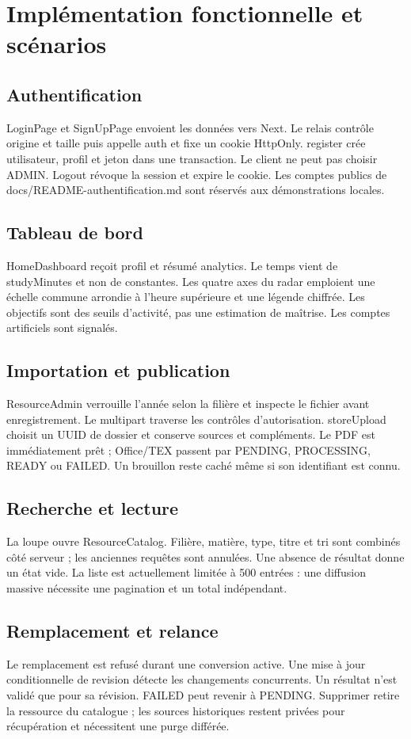 \chapter{Implémentation fonctionnelle et scénarios}
\section{Authentification}
LoginPage et SignUpPage envoient les données vers Next. Le relais contrôle origine et taille puis appelle auth et fixe un cookie HttpOnly. register crée utilisateur, profil et jeton dans une transaction. Le client ne peut pas choisir ADMIN. Logout révoque la session et expire le cookie. Les comptes publics de docs/README-authentification.md sont réservés aux démonstrations locales.

\section{Tableau de bord}
HomeDashboard reçoit profil et résumé analytics. Le temps vient de studyMinutes et non de constantes. Les quatre axes du radar emploient une échelle commune arrondie à l’heure supérieure et une légende chiffrée. Les objectifs sont des seuils d’activité, pas une estimation de maîtrise. Les comptes artificiels sont signalés.

\section{Importation et publication}
ResourceAdmin verrouille l’année selon la filière et inspecte le fichier avant enregistrement. Le multipart traverse les contrôles d’autorisation. storeUpload choisit un UUID de dossier et conserve sources et compléments. Le PDF est immédiatement prêt ; Office/TEX passent par PENDING, PROCESSING, READY ou FAILED. Un brouillon reste caché même si son identifiant est connu.

\section{Recherche et lecture}
La loupe ouvre ResourceCatalog. Filière, matière, type, titre et tri sont combinés côté serveur ; les anciennes requêtes sont annulées. Une absence de résultat donne un état vide. La liste est actuellement limitée à 500 entrées : une diffusion massive nécessite une pagination et un total indépendant.

\section{Remplacement et relance}
Le remplacement est refusé durant une conversion active. Une mise à jour conditionnelle de revision détecte les changements concurrents. Un résultat n’est validé que pour sa révision. FAILED peut revenir à PENDING. Supprimer retire la ressource du catalogue ; les sources historiques restent privées pour récupération et nécessitent une purge différée.

